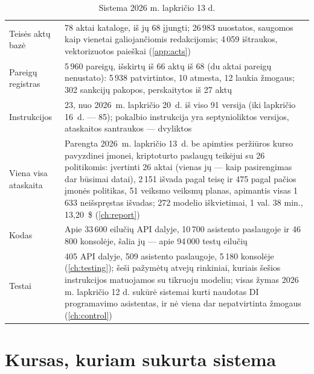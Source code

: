 \begin{table}[H]
\caption{Sistema 2026 m. lapkričio 13 d.}\label{tab:intro:numbers}
\begin{tabularx}{\textwidth}{@{}L{44mm}Y@{}}
\toprule
{} &  \\
\midrule
Teisės aktų bazė & 78 aktai kataloge, iš jų 68 įjungti; 26\,983 nuostatos, saugomos kaip
  vienetai galiojančiomis redakcijomis; 4\,059 ištraukos, vektorizuotos paieškai
  (\cref{app:acts}) \\
Pareigų registras & 5\,960 pareigų, išskirtų iš 66 aktų iš 68 (du aktai pareigų nenustato): 5\,938
  patvirtintos, 10 atmesta, 12 laukia žmogaus; 302 sankcijų pakopos, perskaitytos iš 27 aktų \\
Instrukcijos & 23, nuo 2026~m. lapkričio 20~d. iš viso 91 versija (iki lapkričio 16~d. --- 85); pokalbio
  instrukcija yra septynioliktos versijos,
  ataskaitos santraukos --- dvyliktos \\
Viena visa ataskaita & Parengta 2026~m. lapkričio 13~d. be apimties peržiūros kurso pavyzdinei įmonei,
  kriptoturto paslaugų teikėjui su 26 politikomis: įvertinti 26 aktai (vienas jų --- kaip
  pasirengimas dar būsimai datai), 2\,151 išvada pagal teisę ir 475 pagal pačios įmonės
  politikas, 51 veiksmo veiksmų planas, apimantis visas 1\,633 neišspręstas išvadas;
  272 modelio iškvietimai, 1 val. 38 min., 13,20~\$ (\cref{ch:report}) \\
Kodas & Apie 33\,600 eilučių API dalyje, 10\,700 asistento paslaugoje ir 46\,800 konsolėje, šalia
  jų --- apie 94\,000 testų eilučių \\
Testai & 405 API dalyje, 509 asistento paslaugoje, 5\,180 konsolėje (\cref{ch:testing}); šeši
  pažymėtų atvejų rinkiniai, kuriais šešios instrukcijos matuojamos su tikruoju modeliu;
  visas žymas 2026 m. lapkričio 12 d. sukūrė sistemai kurti naudotas DI programavimo
  asistentas, ir nė viena dar nepatvirtinta žmogaus (\cref{ch:control}) \\
\bottomrule
\end{tabularx}
\end{table}

\section{Kursas, kuriam sukurta sistema}\label{sec:intro:course}

